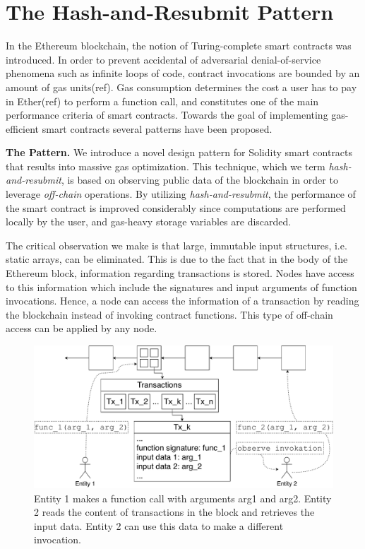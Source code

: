 \section{The Hash-and-Resubmit Pattern}

In the Ethereum blockchain, the notion of Turing-complete smart contracts was
introduced. In order to prevent accidental of adversarial denial-of-service
phenomena such as infinite loops of code, contract invocations are bounded by
an amount of gas units(ref). Gas consumption determines the cost a user has to
pay in Ether(ref) to perform a function call, and constitutes one of the main
performance criteria of smart contracts. Towards the goal of implementing
gas-efficient smart contracts several patterns have been proposed.

\noindent \textbf{The Pattern.} We introduce a novel design pattern for
Solidity smart contracts that results into massive gas optimization. This
technique, which we term \emph{hash-and-resubmit}, is based on observing public
data of the blockchain in order to leverage \emph{off-chain} operations. By
utilizing \emph{hash-and-resubmit}, the performance of the smart contract is
improved considerably since computations are performed locally by the user, and
gas-heavy storage variables are discarded.

The critical observation we make is that large, immutable input structures,
i.e. static arrays, can be eliminated. This is due to the fact that in the body
of the Ethereum block, information regarding transactions is stored. Nodes have
access to this information which include the signatures and input arguments of
function invocations. Hence, a node can access the information of a transaction
by reading the blockchain instead of invoking contract functions. This type of
off-chain access can be applied by any node.

\begin{figure}[h]
    \begin{center}
        \includegraphics[width=1\columnwidth]{figures/observer-tx.pdf}
    \end{center}
    \caption{Entity 1 makes a function call with arguments arg1 and arg2.
    Entity 2 reads the content of transactions in the block and retrieves the
    input data. Entity 2 can use this data to make a different invocation.}
    \label{fig:observe-tx}
\end{figure}

